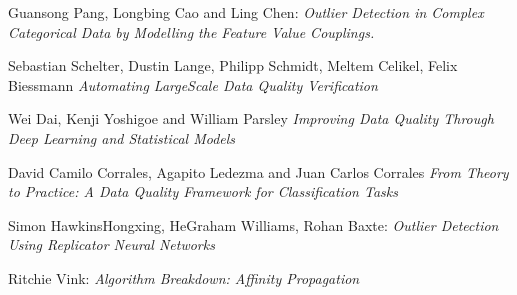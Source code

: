 \documentclass{article}
\begin{document}
\begin{thebibliography}{999}

    Guansong Pang, Longbing Cao and Ling Chen:
    \emph{Outlier Detection in Complex Categorical Data
        by Modelling the Feature Value Couplings.}

    Sebastian Schelter, Dustin Lange, Philipp Schmidt, Meltem Celikel, Felix Biessmann
    \emph{Automating LargeScale Data Quality Verification}

    Wei Dai, Kenji Yoshigoe and William Parsley
    \emph{Improving Data Quality Through Deep Learning and Statistical Models}

    David Camilo Corrales, Agapito Ledezma and Juan Carlos Corrales
    \emph{From Theory to Practice: A Data Quality Framework
        for Classification Tasks}

    Simon HawkinsHongxing, HeGraham Williams, Rohan Baxte:
    \emph{Outlier Detection Using Replicator Neural Networks}

    Ritchie Vink:
    \emph{Algorithm Breakdown: Affinity Propagation}


\end{thebibliography}
\end{document}
